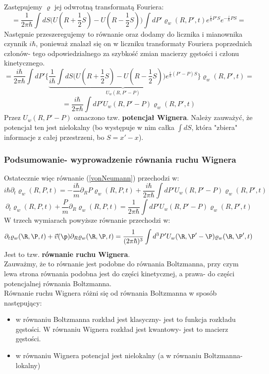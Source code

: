 \begin{itemize}
\begin{equation}
\nonumber
\end{equation}
Zastępujemy $\varrho$ jej odwrotną transformatą Fouriera:
\begin{equation}=\frac{1}{2\pi\hbar}\int dS\Big(U(R+\frac{1}{2}S)-U(R-\frac{1}{2}S)\Big)
\int dP'\varrho_w(R,P',t)e^{\frac{i}{\hbar}P'S}e^{-\frac{i}{\hbar}PS}=
\nonumber
\end{equation}
Następnie przeszeregujemy to równanie oraz dodamy do licznika i mianownika czynnik $i\hbar$, ponieważ znalazł się on w liczniku transformaty Fouriera poprzednich członów- tego odpowiedzialnego za szybkość zmian macierzy gęstości i członu kinetycznego.
\begin{equation}=\frac{i\hbar}{2\pi \hbar}\int dP'
\Big\lbrace \underbrace{
\frac{1}{i\hbar}\int dS\Big(U(R+\frac{1}{2}S)-U(R-\frac{1}{2}S)\Big)
e^{\frac{i}{\hbar}(P'-P)S}}_{U_w(R,P'-P)}
\Big\rbrace
\varrho_w(R,P',t)=
\nonumber
\end{equation}
\begin{equation}=\frac{i\hbar}{2\pi \hbar}\int dP'
U_w(R,P'-P)
\varrho_w(R,P',t)
\end{equation}
Przez $U_w(R,P'-P)$ oznaczono tzw. \textbf{potencjał Wignera}. Należy zauważyć, że potencjał ten jest nielokalny (bo występuje w nim całka $\int dS$, która "zbiera" informacje z całej przestrzeni, bo $S=x'-x$).
\end{itemize}
\subsubsection{Podsumowanie- wyprowadzenie równania ruchu Wignera}
Ostatecznie więc równanie (\ref{vonNeumann}) przechodzi w:
\begin{equation}
i\hbar\partial_t\varrho_w(R,P,t)=
-\frac{i\hbar}{m}\partial_R P\varrho_w(R,P,t)
+\frac{i\hbar}{2\pi \hbar}\int dP' U_w(R,P'-P) \varrho_w(R,P',t)
\end{equation}
\begin{equation}
\partial_t\varrho_w(R,P,t)
+\frac{P}{m}\partial_R \varrho_w(R,P,t)
=\frac{1}{2\pi \hbar}\int dP' U_w(R,P'-P) \varrho_w(R,P',t)
\label{rWignera}
\end{equation}
W trzech wymiarach powyższe równanie przechodzi w:
\begin{equation}
\partial_t\varrho_w(\R,\P,t)+\vec{v}(\p)\partial_R \varrho_w(\R,\P,t)
=\frac{1}{(2\pi \hbar)^3}\int d^3P' U_w(\R,\P'-\P) \varrho_w(\R,\P',t)
\end{equation}
Jest to tzw. \textbf{równanie ruchu Wignera}.\\
Zauważmy, że to równanie jest podobne do równania Boltzmanna, przy czym lewa strona równania podobna jest do części kinetycznej, a prawa- do części potencjalnej równania Boltzmanna.\\
Równanie ruchu Wignera różni się od równania Boltzmanna w sposób następujący:
\begin{itemize}
\item w równaniu Boltzmanna rozkład jest klasyczny- jest to funkcja rozkładu gęstości. W równaniu Wignera rozkład jest kwantowy- jest to macierz gęstości.
\item w równaniu Wignera potencjał jest nielokalny (a w równaniu Boltzmanna- lokalny)
\end{itemize}
